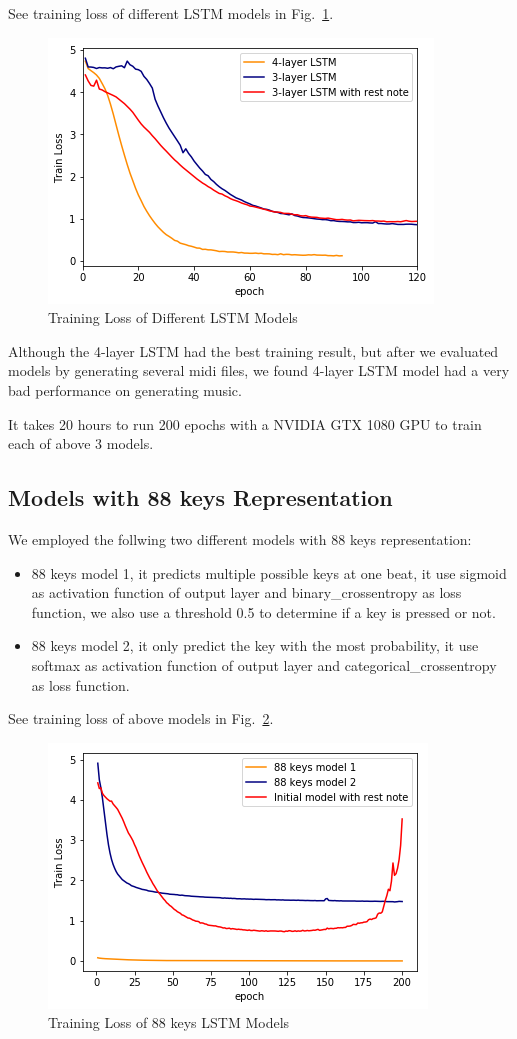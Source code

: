 \documentclass[conference]{IEEEtran}
\begin{document}
See training loss of different LSTM models in Fig.~\ref{fig1}.

\begin{figure}[htbp]
\centerline{\includegraphics[scale=0.5]{pics/compare1.png}}
\caption{Training Loss of Different LSTM Models}
\label{fig1}
\end{figure}

Although the 4-layer LSTM had the best training result, but after we evaluated models by generating several midi files, we found 4-layer LSTM model had a very bad performance on generating music.

It takes 20 hours to run 200 epochs with a NVIDIA GTX 1080 GPU to train each of above 3 models.

\subsection{Models with 88 keys Representation}
We employed the follwing two different models with 88 keys representation:
\begin{itemize}
\item 88 keys model 1, it predicts multiple possible keys at one beat, it use sigmoid as activation function of output layer and binary\_crossentropy as loss function, we also use a threshold 0.5 to determine if a key is pressed or not.
\item 88 keys model 2, it only predict the key with the most probability, it use softmax as activation function of output layer and categorical\_crossentropy as loss function.
\end{itemize}

See training loss of above models in Fig.~\ref{fig2}.
\begin{figure}[htbp]
\centerline{\includegraphics[scale=0.5]{pics/compare2.png}}
\caption{Training Loss of 88 keys LSTM Models}
\label{fig2}
\end{figure}
\end{document}
